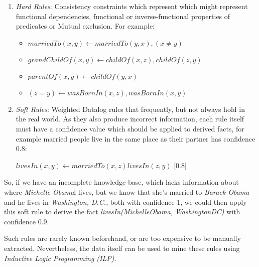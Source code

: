 \begin{enumerate}

 \item \emph{Hard Rules}: Consistency constraints which represent which might represent functional
dependencies, functional or inverse-functional properties of predicates or Mutual exclusion. For example:
    \begin{itemize}
      \item \begin{math} marriedTo(x,y) \leftarrow marriedTo(y,x),(x \neq y)\end{math}
      \item \begin{math} grandChildOf(x,y) \leftarrow childOf(x,z),childOf(z,y)\end{math}
      \item \begin{math} parentOf(x,y) \leftarrow childOf(y,x)\end{math}
      \item \begin{math} (z=y) \leftarrow wasBornIn(x,z),wasBornIn(x,y)\end{math}
    \end{itemize}

 \item \emph{Soft Rules}: Weighted Datalog rules that frequently, but not always hold in the real world. As they also
produce incorrect information, each rule itself must have a confidence value which should be applied to derived facts,
for example married people live in the same place as their partner has confidence 0.8:
    \begin{center}
      \begin{math} livesIn(x,y) \leftarrow marriedTo(x,z)livesIn(z,y)\end{math} [0.8]
    \end{center}
\end{enumerate}

So, if we have an incomplete knowledge base, which lacks information about where \emph{Michelle Obama}l lives, but
we know that she's married to \emph{Barack Obama} and he lives in \emph{Washington, D.C.}, both with confidence 1, we
could then apply this soft rule to derive the fact \emph{livesIn(MichelleObama, WashingtonDC)} with confidence 0.9.

Such rules are rarely known beforehand, or are too expensive to be manually extracted. Nevertheless, the data itself can
be used to mine these rules using \emph{Inductive Logic Programming (ILP)}. 

